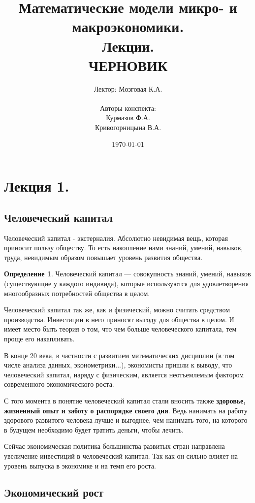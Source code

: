 \documentclass[reqno]{article}
\title{Математические модели микро- и макроэкономики.\\ Лекции.\\ ЧЕРНОВИК}
\author{Лектор: Мозговая К.А.\\ \\ Авторы конспекта: \\ Курмазов Ф.А.\\ Кривогорницына В.А.}
\date{\today}
\theoremstyle{definition}
\theoremstyle{definition}
\theoremstyle{definition}
\theoremstyle{definition}
\theoremstyle{definition}
\theoremstyle{definition}
\theoremstyle{definition}
\newtheorem*{defi}{Определение}
\theoremstyle{definition}
\theoremstyle{definition}
\begin{document}
	
	\setlength{\parindent}{0pt}
	\setlength{\parskip}{0.3em}
	
	\maketitle
	
	\tableofcontents
	\newpage
	
	\section{Лекция 1.}
	\subsection{Человеческий капитал}
	Человеческий капитал - экстерналия. Абсолютно невидимая вещь, которая приносит пользу обществу. То есть накопление нами знаний, умений, навыков, труда, невидимым образом повышает уровень развития общества.
	
	\begin{defi}
		Человеческий капитал — совокупность знаний, умений, навыков (существующие у каждого индивида), которые используются для удовлетворения многообразных потребностей общества в целом.
	\end{defi}
	
	Человеческий капитал так же, как и физический, можно считать средством производства. Инвестиции в него приносят выгоду для общества в целом. И имеет место быть теория о том, что чем больше человеческого капитала, тем проще его накапливать. 
	
	В конце 20 века, в частности с развитием математических дисциплин (в том числе анализа данных, эконометрики...), экономисты пришли к выводу, что человеческий капитал, наряду с физическим, является неотъемлемым фактором современного экономического роста.
	
	С того момента в понятие человеческий капитал стали вносить также \textbf{здоровье, жизненный опыт и заботу о распорядке своего дня}. Ведь нанимать на работу здорового развитого человека лучше и выгоднее, чем нанимать того, на которого в будущем необходимо будет тратить деньги, чтобы лечить.
	
	Сейчас экономическая политика большинства развитых стран направлена увеличение инвестиций в человеческий капитал. Так как он сильно влияет на уровень выпуска в экономике и на темп его роста. 
	
	\subsection{Экономический рост}\label{sec:1.2}
	
\end{document}
